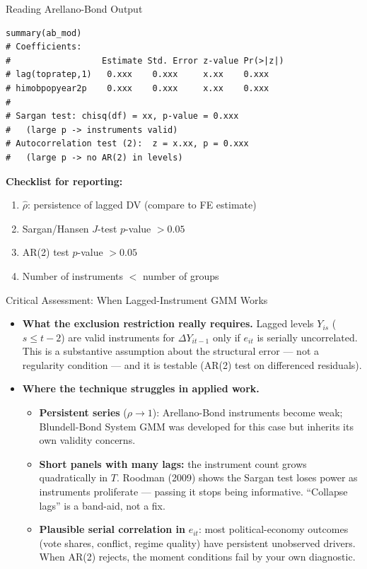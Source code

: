 \documentclass[aspectratio=169, handout, t]{beamer}
\numberwithin{equation}{section}
\begin{document}
\begin{frame}[fragile]{Reading Arellano-Bond Output}
\begin{lstlisting}[basicstyle=\ttfamily\scriptsize]
summary(ab_mod)
# Coefficients:
#                  Estimate Std. Error z-value Pr(>|z|)
# lag(topratep,1)   0.xxx    0.xxx     x.xx    0.xxx
# himobpopyear2p    0.xxx    0.xxx     x.xx    0.xxx
#
# Sargan test: chisq(df) = xx, p-value = 0.xxx
#   (large p -> instruments valid)
# Autocorrelation test (2):  z = x.xx, p = 0.xxx
#   (large p -> no AR(2) in levels)
\end{lstlisting}
\smallskip
\textbf{Checklist for reporting:}
\begin{enumerate}\itemsep=1pt
\item $\hat{\rho}$: persistence of lagged DV (compare to FE estimate)
\item Sargan/Hansen $J$-test $p$-value $> 0.05$
\item AR(2) test $p$-value $> 0.05$
\item Number of instruments $<$ number of groups
\end{enumerate}
\end{frame}


\begin{frame}{Critical Assessment: When Lagged-Instrument GMM Works}
\begin{itemize}
\item \textbf{What the exclusion restriction really requires.}  Lagged levels $Y_{is}$ ($s\le t-2$) are valid instruments for $\Delta Y_{it-1}$ \alert{only if $e_{it}$ is serially uncorrelated}.  This is a substantive assumption about the structural error --- not a regularity condition --- and it is testable (AR(2) test on differenced residuals).
\item \textbf{Where the technique struggles in applied work.}
\begin{itemize}
\item \textbf{Persistent series} ($\rho\to 1$): Arellano-Bond instruments become weak; Blundell-Bond System GMM was developed for this case but inherits its own validity concerns.
\item \textbf{Short panels with many lags:} the instrument count grows quadratically in $T$.  Roodman (2009) shows the Sargan test loses power as instruments proliferate --- passing it stops being informative.  ``Collapse lags'' is a band-aid, not a fix.
\item \textbf{Plausible serial correlation in} $e_{it}$: most political-economy outcomes (vote shares, conflict, regime quality) have persistent unobserved drivers.  When AR(2) rejects, the moment conditions fail by your own diagnostic.
\end{itemize}
\end{itemize}
\end{frame}
\end{document}
